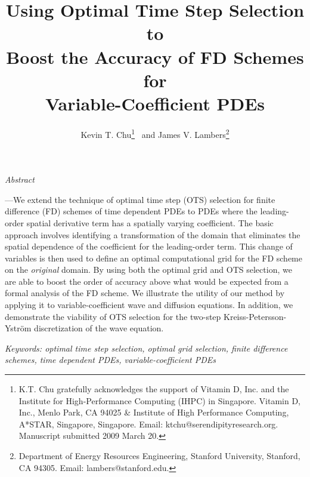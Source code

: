 \documentclass[twocolumn]{article} %
\begin{document}


\date{}

\title{\huge \bf {Using Optimal Time Step Selection to \\ 
       Boost the Accuracy of FD Schemes for \\
       Variable-Coefficient PDEs }}

\author{Kevin T. Chu\thanks{
  K.T. Chu gratefully acknowledges the support of Vitamin D, Inc.
  and the Institute for High-Performance Computing (IHPC) in Singapore. 
  Vitamin D, Inc., Menlo Park, CA 94025 \& 
  Institute of High Performance Computing, A*STAR, Singapore, Singapore.
  Email: ktchu@serendipityresearch.org.
  Manuscript submitted 2009 March 20. 
 } 
 \ and
 James V. Lambers\thanks{Department of Energy Resources Engineering, 
 Stanford University, Stanford, CA 94305.  Email: lambers@stanford.edu.}
}

\maketitle
\thispagestyle{empty}

{\hspace{1pc} {\it{\small Abstract}}{\bf{\small---We extend the technique 
of optimal time step (OTS) selection for finite difference (FD) schemes of time 
dependent PDEs to PDEs where the leading-order spatial derivative term has a
spatially varying coefficient.  The basic approach involves identifying a 
transformation of the domain that eliminates the spatial dependence of the 
coefficient for the leading-order term.  This change of variables is then used 
to define an optimal computational grid for the FD scheme on the 
\emph{original} domain.   By using both the optimal grid and OTS selection, we are
able to boost the order of accuracy above what would be expected from a formal
analysis of the FD scheme.  We illustrate the utility of our method by 
applying it to variable-coefficient wave and diffusion equations.  In 
addition, we demonstrate the viability of OTS selection for the two-step 
Kreiss-Petersson-Ystr\"om discretization of the wave equation.

\em Keywords: optimal time step selection, optimal grid selection, finite 
    difference schemes, time dependent PDEs, variable-coefficient PDEs}}
 }
\end{document}
